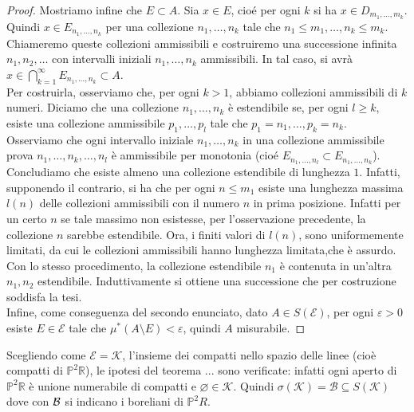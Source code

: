 \documentclass[a4paper, twoside,openright]{article}
\newcommand{\R}{\mathbb{R}}
\renewcommand{\P}{\mathbb{P}}
\newcommand{\<}{\langle}
\renewcommand{\>}{\rangle}
\begin{document}
\begin{proof}
	Mostriamo infine che $E \subset A$. Sia $x \in E$, cioé per ogni $k$ si ha $x \in D_{m_{1}, \ldots, m_{k}}$. Quindi $x \in E_{n_{1}, \ldots, n_{k}}$ per una collezione $n_{1}, \ldots, n_{k}$ tale che $n_{1} \leq m_{1}, \ldots, n_{k} \leq m_{k}$.\\
	Chiameremo queste collezioni ammissibili e costruiremo una successione infinita $n_{1}, n_{2}, \ldots$ con intervalli iniziali $n_{1}, \ldots, n_{k}$ ammissibili.	In tal caso, si avrà $x \in \bigcap_{k=1}^{\infty} E_{n_{1}, \ldots, n_{k}} \subset A$.\\
	Per costruirla, osserviamo che, per ogni $k>1$, abbiamo collezioni ammissibili di $k$ numeri. Diciamo che una collezione $n_{1}, \ldots, n_{k}$ è estendibile se, per ogni $l \geq k$, esiste una collezione ammissibile $p_{1}, \ldots, p_{l}$ tale che $p_1=n_1,...,p_k=n_k$.\\
	Osserviamo che ogni intervallo iniziale $n_{1}, \ldots, n_{k}$ in una collezione ammissibile prova $n_{1}, \ldots, n_{k}, \ldots, n_{l}$ è ammissibile per monotonia (cioé $E_{n_{1}, \ldots, n_{l}} \subset E_{n_{1}, \ldots, n_{k}}$).\\
	Concludiamo che esiste almeno una collezione estendibile di lunghezza $1$. Infatti, supponendo il contrario, si ha che per ogni $n \leq m_{1}$ esiste una lunghezza massima $l(n)$ delle collezioni ammissibili con il numero $n$ in prima posizione. Infatti per un certo $n$ se tale massimo non esistesse, per l'osservazione precedente, la collezione $n$ sarebbe estendibile. Ora, i finiti valori di $l(n)$, sono uniformemente limitati, da cui le collezioni ammissibili hanno lunghezza limitata,che è assurdo.\\
	Con lo stesso procedimento, la collezione estendibile $n_{1}$ è contenuta in un'altra $n_{1}, n_{2}$ estendibile. Induttivamente si ottiene una successione che per costruzione soddisfa la tesi.\\
	Infine, come conseguenza del secondo enunciato, dato $A \in S(\mathcal{E})$, per ogni $\varepsilon >0$ esiste $E \in \mathcal{E}$ tale che $\mu^*(A \setminus E) < \varepsilon$, quindi $A$ misurabile.

\end{proof}

Scegliendo come $\mathcal{E}=\mathcal{K}$, l'insieme dei compatti nello spazio delle linee (cioè compatti di $\P^2 \R$), le ipotesi del teorema ... sono verificate: infatti ogni aperto di $\P^2 \R$ è unione numerabile di compatti e $\varnothing \in \mathcal{K}$. Quindi $\sigma(\mathcal{K})=\mathcal{B} \subseteq S(\mathcal{K})$ dove con ${\cal B}$ si indicano i boreliani di $\P^2R$.\\
\end{document}
